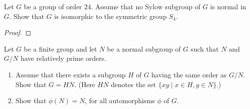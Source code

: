 \begin{prob}[F2018-Q2]
    Let \( G \) be a group of order \( 24 \). Assume that no Sylow subgroup of \( G \) is normal in \( G \). Show that \( G \) is isomorphic to the symmetric group \( S_4 \).
\end{prob}
\begin{proof}
    
\end{proof}


\begin{prob}[F2001-Q1]
    Let \( G \) be a finite group and let \( N \) be a normal subgroup of \( G \) such that \( N \) and \( G/N \) have relatively prime orders.
        
        \begin{enumerate}
            \item Assume that there exists a subgroup \( H \) of \( G \) having the same order as \( G/N \). Show that \( G = HN \). (Here \( HN \) denotes the set \(\{xy \mid x \in H, y \in N\}\).)
            
            \item Show that \( \phi(N) = N \), for all automorphisms \( \phi \) of \( G \).
        \end{enumerate}
\end{prob}

